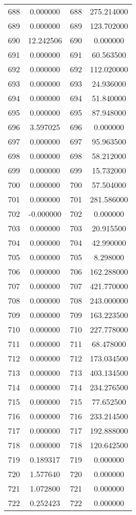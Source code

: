 \documentclass[12pt]{article}
\begin{document}
\begin{longtable}{@{}cccc@{}}
688 & 0.000000 & 688 & 275.214000 \\
689 & 0.000000 & 689 & 123.702000 \\
690 & 12.242506 & 690 & 0.000000 \\
691 & 0.000000 & 691 & 60.563500 \\
692 & 0.000000 & 692 & 112.020000 \\
693 & 0.000000 & 693 & 24.936000 \\
694 & 0.000000 & 694 & 51.840000 \\
695 & 0.000000 & 695 & 87.948000 \\
696 & 3.597025 & 696 & 0.000000 \\
697 & 0.000000 & 697 & 95.963500 \\
698 & 0.000000 & 698 & 58.212000 \\
699 & 0.000000 & 699 & 15.732000 \\
700 & 0.000000 & 700 & 57.504000 \\
701 & 0.000000 & 701 & 281.586000 \\
702 & -0.000000 & 702 & 0.000000 \\
703 & 0.000000 & 703 & 20.915500 \\
704 & 0.000000 & 704 & 42.990000 \\
705 & 0.000000 & 705 & 8.298000 \\
706 & 0.000000 & 706 & 162.288000 \\
707 & 0.000000 & 707 & 421.770000 \\
708 & 0.000000 & 708 & 243.000000 \\
709 & 0.000000 & 709 & 163.223500 \\
710 & 0.000000 & 710 & 227.778000 \\
711 & 0.000000 & 711 & 68.478000 \\
712 & 0.000000 & 712 & 173.034500 \\
713 & 0.000000 & 713 & 403.134500 \\
714 & 0.000000 & 714 & 234.276500 \\
715 & 0.000000 & 715 & 77.652500 \\
716 & 0.000000 & 716 & 233.214500 \\
717 & 0.000000 & 717 & 192.888000 \\
718 & 0.000000 & 718 & 120.642500 \\
719 & 0.189317 & 719 & 0.000000 \\
720 & 1.577640 & 720 & 0.000000 \\
721 & 1.072800 & 721 & 0.000000 \\
722 & 0.252423 & 722 & 0.000000 \\

\end{longtable}
\end{document}
